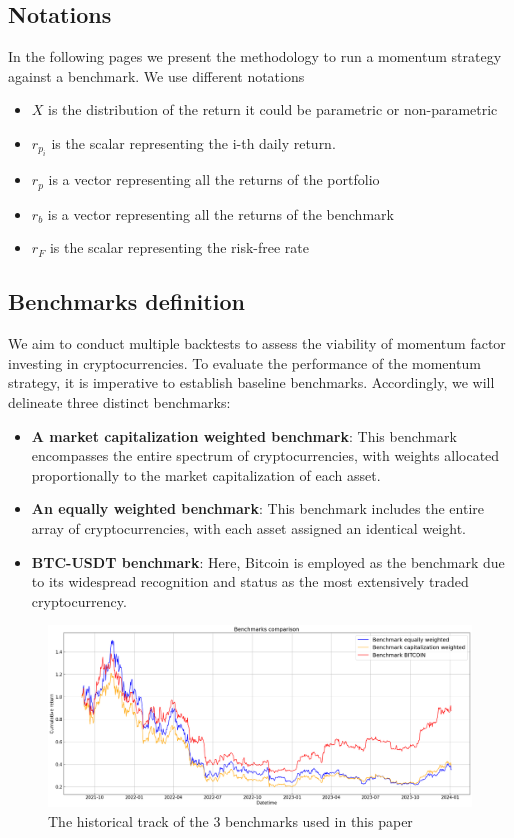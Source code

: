 \documentclass{article}
\begin{document}
\subsection{Notations}
In the following pages we present the methodology to run a momentum strategy against a benchmark. We use different notations
\begin{itemize}
	\item $X$ is the distribution of the return it could be parametric or non-parametric
	\item $r_{p_i}$ is the scalar representing the i-th daily return.
	\item $r_p$ is a vector representing all the returns of the portfolio
	\item $r_b$ is a vector representing all the returns of the benchmark
	\item $r_F$ is the scalar representing the risk-free rate
\end{itemize}

\subsection{Benchmarks definition}
We aim to conduct multiple backtests to assess the viability of momentum factor investing in cryptocurrencies. To evaluate the performance of the momentum strategy, it is imperative to establish baseline benchmarks. Accordingly, we will delineate three distinct benchmarks:
\begin{itemize}
	\item \textbf{A market capitalization weighted benchmark}: This benchmark encompasses the entire spectrum of cryptocurrencies, with weights allocated proportionally to the market capitalization of each asset.
	\item \textbf{An equally weighted benchmark}: This benchmark includes the entire array of cryptocurrencies, with each asset assigned an identical weight.
	\item \textbf{BTC-USDT benchmark}: Here, Bitcoin is employed as the benchmark due to its widespread recognition and status as the most extensively traded cryptocurrency.
\end{itemize}

\begin{figure} %
	\centering
	\includegraphics[width=1\linewidth]{benchmarks_only.png}
	\caption{The historical track of the 3 benchmarks used in this paper}
	\label{fig:fig1}
\end{figure}
\end{document}
